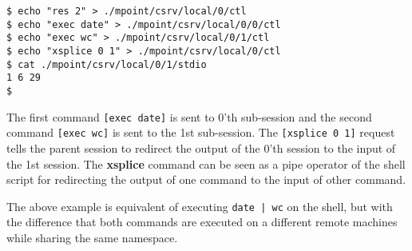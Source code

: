 \begin{verbatim}
$ echo "res 2" > ./mpoint/csrv/local/0/ctl
$ echo "exec date" > ./mpoint/csrv/local/0/0/ctl
$ echo "exec wc" > ./mpoint/csrv/local/0/1/ctl
$ echo "xsplice 0 1" > ./mpoint/csrv/local/0/ctl
$ cat ./mpoint/csrv/local/0/1/stdio
1 6 29
$
\end{verbatim}

The first command \texttt{[exec date]} is sent to 0'th sub-session and the
second command \texttt{[exec wc]} is sent to the 1st sub-session.  The
\texttt{[xsplice 0 1]} request tells the parent session to redirect the output
of the 0'th session to the input of the 1st session.  The \textbf{xsplice}
command can be seen as a pipe operator of the shell script for redirecting the
output of one command to the input of other command.

The above example is equivalent of executing \texttt{date | wc} on the shell,
but with the difference that both commands are executed on a different remote
machines while sharing the same namespace.

